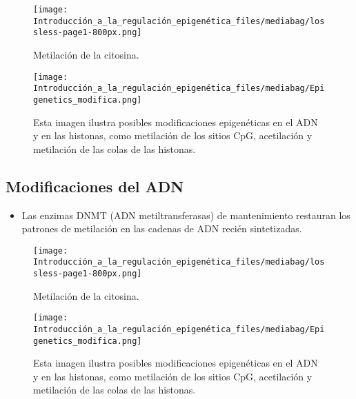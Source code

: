 \documentclass[
  letterpaper,
  DIV=11,
  numbers=noendperiod]{scrartcl}
\providecommand{\tightlist}{%
  \setlength{\itemsep}{0pt}\setlength{\parskip}{0pt}}\usepackage{longtable,booktabs,array}
\begin{document}
\begin{figure}[H]

{\centering \texttt{[image: Introducción\_a\_la\_regulación\_epigenética\_files/mediabag/lossless-page1-800px.png]}

}

\caption{Metilación de la citosina.}

\end{figure}%
\begin{figure}[H]

{\centering \texttt{[image: Introducción\_a\_la\_regulación\_epigenética\_files/mediabag/Epigenetics\_modifica.png]}

}

\caption{Esta imagen ilustra posibles modificaciones epigenéticas en el
ADN y en las histonas, como metilación de los sitios CpG, acetilación y
metilación de las colas de las histonas.}

\end{figure}%

\subsection{Modificaciones del ADN}\label{modificaciones-del-adn-2}

\begin{itemize}
\tightlist
\item
  Las enzimas DNMT (ADN metiltransferasas) de mantenimiento restauran
  los patrones de metilación en las cadenas de ADN recién sintetizadas.
\end{itemize}

\begin{figure}[H]

{\centering \texttt{[image: Introducción\_a\_la\_regulación\_epigenética\_files/mediabag/lossless-page1-800px.png]}

}

\caption{Metilación de la citosina.}

\end{figure}%
\begin{figure}[H]

{\centering \texttt{[image: Introducción\_a\_la\_regulación\_epigenética\_files/mediabag/Epigenetics\_modifica.png]}

}

\caption{Esta imagen ilustra posibles modificaciones epigenéticas en el
ADN y en las histonas, como metilación de los sitios CpG, acetilación y
metilación de las colas de las histonas.}

\end{figure}%
\end{document}

